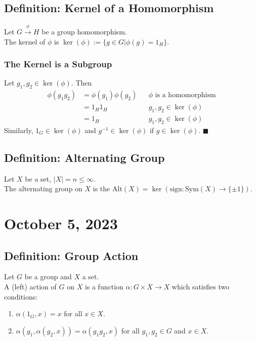 \documentclass[11pt]{article}
\newcommand{\0}{\emptyset}
\begin{document}
\subsection*{Definition: Kernel of a Homomorphism}
\label{sec:orgc708957}
Let \(G\overset{\phi}{\to}H\) be a group homomorphism.\\[0pt]
The kernel of \(\phi\) is \(\ker(\phi):=\{g\in G|\phi(g)=1_{H}\}\).\\[0pt]
\subsubsection*{The Kernel is a Subgroup}
\label{sec:org676e86d}
Let \(g_{1},g_{2}\in\ker(\phi)\). Then\\[0pt]
\begin{align*}
  \phi(g_{1}g_{2})
  &=\phi(g_{1})\phi(g_{2}) && \phi\text{ is a homomorphism}
  \\&=1_{H}1_{H} && g_{1},g_{2}\in\ker(\phi)
  \\&=1_{H} && g_{1},g_{2}\in\ker(\phi)
\end{align*}
Similarly, \(1_{G}\in\ker(\phi)\) and \(g^{-1}\in\ker(\phi)\) if \(g\in\ker(\phi)\). \(\blacksquare\) \\[0pt]
\subsection*{Definition: Alternating Group}
\label{sec:org6858bc6}
Let \(X\) be a set, \(|X|=n\leq\infty\).\\[0pt]
The alternating group on \(X\) is the \(\text{Alt}(X)=\ker(\text{sign}:\text{Sym}(X)\to\{\pm1\})\).\\[0pt]
\section*{October 5, 2023}
\label{sec:org074d129}
\subsection*{Definition: Group Action}
\label{sec:orgb33cd55}
Let \(G\) be a group and \(X\) a set.\\[0pt]
A (left) action of \(G\) on \(X\) is a function \(\alpha:G\times X\to X\) which satisfies two conditions:\\[0pt]
\begin{enumerate}
\item \(\alpha(1_{G},x)=x\) for all \(x\in X\).\\[0pt]
\item \(\alpha(g_{1},\alpha(g_{2},x))=\alpha(g_{1}g_{2},x)\) for all \(g_{1},g_{2}\in G\) and \(x\in X\).\\[0pt]
\end{enumerate}
\end{document}
